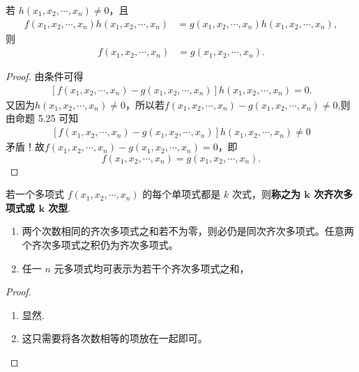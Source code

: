 \documentclass[../../main.tex]{subfiles}%
\begin{document}
\begin{corollary}
若 $h(x_1, x_2, \cdots, x_n) \neq 0$，且
\begin{align*}
f(x_1, x_2, \cdots, x_n)h(x_1, x_2, \cdots, x_n) &= g(x_1, x_2, \cdots, x_n)h(x_1, x_2, \cdots, x_n),
\end{align*}
则
\begin{align*}
f(x_1, x_2, \cdots, x_n) &= g(x_1, x_2, \cdots, x_n).
\end{align*}
\end{corollary}
\begin{proof}
由条件可得
\begin{align*}
\left[ f(x_1,x_2,\cdots ,x_n)-g(x_1,x_2,\cdots ,x_n) \right] h(x_1,x_2,\cdots ,x_n)=0.
\end{align*}
又因为$h(x_1,x_2,\cdots ,x_n)\ne 0，所以若 f(x_1,x_2,\cdots ,x_n)-g(x_1,x_2,\cdots ,x_n)\ne 0$,则由命题 5.25 可知
\begin{align*}
\left[ f(x_1,x_2,\cdots ,x_n)-g(x_1,x_2,\cdots ,x_n) \right] h(x_1,x_2,\cdots ,x_n)\ne 0
\end{align*}
矛盾！故$f(x_1,x_2,\cdots ,x_n)-g(x_1,x_2,\cdots ,x_n)=0$，即\[f(x_1,x_2,\cdots ,x_n)=g(x_1,x_2,\cdots ,x_n).\]
\end{proof}



\begin{definition}[齐次多项式]
若一个多项式 \(f(x_1,x_2,\cdots ,x_n)\) 的每个单项式都是 \(k\) 次式，则\textbf{称之为 \(\boldsymbol{k}\) 次齐次多项式或 \(\boldsymbol{k}\) 次型}.
\end{definition}

\begin{proposition}[齐次多项式的基本性质]
\begin{enumerate}[(1)]
\item 两个次数相同的齐次多项式之和若不为零，则必仍是同次齐次多项式。任意两个齐次多项式之积仍为齐次多项式。

\item 任一 \(n\) 元多项式均可表示为若干个齐次多项式之和，
\end{enumerate}
\end{proposition}
\begin{proof}
\begin{enumerate}[(1)]
\item 显然.

\item 这只需要将各次数相等的项放在一起即可。
\end{enumerate}
\end{proof}
\end{document}
